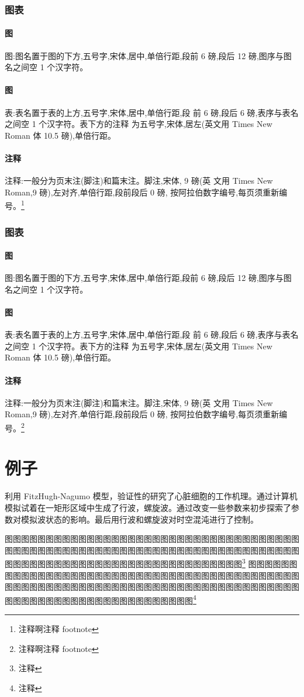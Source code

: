 \documentclass{LZU}
\begin{document}
\subsection{图表}
\subsubsection{图}
图:图名置于图的下方,五号字,宋体,居中,单倍行距,段前 6 磅,段后 12 磅,图序与图名之间空 1 个汉字符。
\subsubsection{图}
表:表名置于表的上方,五号字,宋体,居中,单倍行距,段 前 6 磅,段后 6 磅,表序与表名之间空 1 个汉字符。表下方的注释 为五号字,宋体,居左(英文用 Times New Roman 体 10.5 磅),单倍行距。
\subsubsection{注释}
注释:一般分为页末注(脚注)和篇末注。脚注,宋体, 9 磅(英 文用 Times New Roman,9 磅),左对齐,单倍行距,段前段后 0 磅, 按阿拉伯数字编号,每页须重新编号。\footnote{注释啊注释 footnote}
\subsection{图表}
\subsubsection{图}
图:图名置于图的下方,五号字,宋体,居中,单倍行距,段前 6 磅,段后 12 磅,图序与图名之间空 1 个汉字符。
\subsubsection{图}
表:表名置于表的上方,五号字,宋体,居中,单倍行距,段 前 6 磅,段后 6 磅,表序与表名之间空 1 个汉字符。表下方的注释 为五号字,宋体,居左(英文用 Times New Roman 体 10.5 磅),单倍行距。
\subsubsection{注释}
注释:一般分为页末注(脚注)和篇末注。脚注,宋体, 9 磅(英 文用 Times New Roman,9 磅),左对齐,单倍行距,段前段后 0 磅, 按阿拉伯数字编号,每页须重新编号。\footnote{注释啊注释 footnote}
\chapter{例子}
利用 FitzHugh-Nagumo 模型，验证性的研究了心脏细胞的工作机理。\cite{PhysRevLett.76.1619}通过计算机模拟试着在一矩形区域中生成了行波，螺旋波。通过改变一些参数来初步探索了参数对模拟波状态的影响。最后用行波和螺旋波对时空混沌进行了控制。

\printbibliography[title={参考文献},heading=bibintoc]
\Appendix
图图图图图图图图图图图图图图图图图图图图图图图图图图图图图图图图图图图图图图图图图图图图图图图图图图图图图图图图图图图图图图图图图图图图图图图图图图图图图图图图图图图图图图图图图图图图图图图图图图图图图\footnote{注释}
\Thanks
图图图图图图图图图图图图图图图图图图图图图图图图图图图图图图图图图图图图图图图图图图图图图图图图图图图图图图图图图图图图图图图图图图图图图图图图图图图图图图图图图图图图图图图图图图图图图图图图图图图图图\footnote{注释}
\Grade
\end{document}

